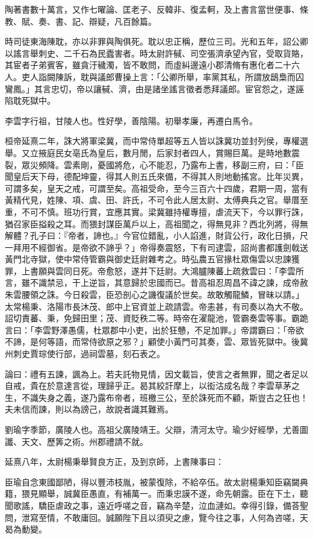 \begin{pinyinscope}
陶著書數十萬言，又作七曜論、匡老子、反韓非、復孟軻，及上書言當世便事、條教、賦、奏、書、記、辯疑，凡百餘篇。

時司徒東海陳耽，亦以非罪與陶俱死。耽以忠正稱，歷位三司。光和五年，詔公卿以謠言舉刺史、二千石為民蠹害者。時太尉許戫、司空張濟承望內官，受取貨賂，其宦者子弟賓客，雖貪汙穢濁，皆不敢問，而虛糾邊遠小郡清脩有惠化者二十六人。吏人詣闕陳訴，耽與議郎曹操上言：「公卿所舉，率黨其私，所謂放鴟梟而囚鸞鳳。」其言忠切，帝以讓戫、濟，由是諸坐謠言徵者悉拜議郎。宦官怨之，遂誣陷耽死獄中。

李雲字行祖，甘陵人也。性好學，善陰陽。初舉孝廉，再遷白馬令。

桓帝延熹二年，誅大將軍梁冀，而中常侍單超等五人皆以誅冀功並封列侯，專權選舉。又立掖庭民女亳氏為皇后，數月閒，后家封者四人，賞賜巨萬。是時地數震裂，眾災頻降。雲素剛，憂國將危，心不能忍，乃露布上書，移副三府，曰：「臣聞皇后天下母，德配坤靈，得其人則五氏來備，不得其人則地動搖宮。比年災異，可謂多矣，皇天之戒，可謂至矣。高祖受命，至今三百六十四歲，君期一周，當有黃精代見，姓陳、項、虞、田、許氏，不可令此人居太尉、太傅典兵之官。舉厝至重，不可不慎。班功行賞，宜應其實。梁冀雖持權專擅，虐流天下，今以罪行誅，猶召家臣搤殺之耳。而猥封謀臣萬戶以上，高祖聞之，得無見非？西北列將，得無解體？孔子曰：『帝者，諦也。』今官位錯亂，小人諂進，財貨公行，政化日損，尺一拜用不經御省。是帝欲不諦乎？」帝得奏震怒，下有司逮雲，詔尚書都護劍戟送黃門北寺獄，使中常侍管霸與御史廷尉雜考之。時弘農五官掾杜眾傷雲以忠諫獲罪，上書願與雲同日死。帝愈怒，遂并下廷尉。大鴻臚陳蕃上疏救雲曰：「李雲所言，雖不識禁忌，干上逆旨，其意歸於忠國而已。昔高祖忍周昌不諱之諫，成帝赦朱雲腰領之誅。今日殺雲，臣恐剖心之譏復議於世矣。故敢觸龍鱗，冒昧以請。」太常楊秉、洛陽市長沐茂、郎中上官資並上疏請雲。帝恚甚，有司奏以為大不敬。詔切責蕃、秉，免歸田里；茂、資貶秩二等。時帝在濯龍池，管霸奏雲等事。霸跪言曰：「李雲野澤愚儒，杜眾郡中小吏，出於狂戇，不足加罪。」帝謂霸曰：「帝欲不諦，是何等語，而常侍欲原之邪？」顧使小黃門可其奏，雲、眾皆死獄中。後冀州刺史賈琮使行部，過祠雲墓，刻石表之。

論曰：禮有五諫，諷為上。若夫託物見情，因文載旨，使言之者無罪，聞之者足以自戒，貴在於意達言從，理歸乎正。曷其絞訐摩上，以衒沽成名哉？李雲草茅之生，不識失身之義，遂乃露布帝者，班檄三公，至於誅死而不顧，斯豈古之狂也！夫未信而諫，則以為謗己，故說者識其難焉。

劉瑜字季節，廣陵人也。高祖父廣陵靖王。父辯，清河太守。瑜少好經學，尤善圖讖、天文、歷筭之術。州郡禮請不就。

延熹八年，太尉楊秉舉賢良方正，及到京師，上書陳事曰：

臣瑜自念東國鄙陋，得以豐沛枝胤，被蒙復除，不給卒伍。故太尉楊秉知臣竊闚典籍，猥見顯舉，誠冀臣愚直，有補萬一。而秉忠謨不遂，命先朝露。臣在下土，聽聞歌謠，驕臣虐政之事，遠近呼嗟之音，竊為辛楚，泣血漣如。幸得引錄，備荅聖問，泄寫至情，不敢庸回。誠願陛下且以須臾之慮，覽今往之事，人何為咨嗟，天曷為動變。


\end{pinyinscope}
